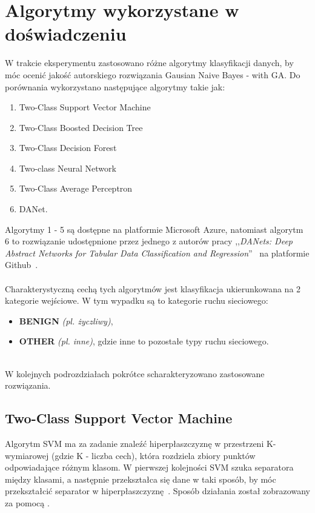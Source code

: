 \section{Algorytmy wykorzystane w doświadczeniu}
\label{sec:alg}
W trakcie eksperymentu zastosowano różne algorytmy klasyfikacji danych, by móc ocenić jakość autorskiego rozwiązania Gausian Naive Bayes - with GA. Do porównania wykorzystano następujące algorytmy takie jak:
\begin{enumerate}
    \item Two-Class Support Vector Machine
    \item Two-Class Boosted Decision Tree
    \item Two-Class Decision Forest
    \item Two-class Neural Network
    \item Two-Class Average Perceptron
    \item DANet.
\end{enumerate}
Algorytmy 1 - 5 są dostępne na platformie Microsoft Azure, natomiast algorytm 6 to rozwiązanie udostępnione przez jednego z autorów pracy ,,\textit{DANets: Deep Abstract Networks for Tabular Data Classification and Regression}''~\cite{Chen2022} na platformie Github~\cite{Danet}.
\\ \\
Charakterystyczną cechą tych algorytmów jest klasyfikacja ukierunkowana na 2 kategorie wejściowe. W tym wypadku są to kategorie ruchu sieciowego:
\begin{itemize}
    \item \textbf{BENIGN} \textit{(pl. życzliwy)},
    \item \textbf{OTHER} \textit{(pl. inne)}, gdzie inne to pozostałe typy ruchu sieciowego.
\end{itemize}
\ \\
W kolejnych podrozdziałach pokrótce scharakteryzowano zastosowane rozwiązania.

\subsection{Two-Class Support Vector Machine}\label{subsec:svm}
Algorytm SVM ma za zadanie znaleźć hiperpłaszczyznę w przestrzeni K-wymiarowej (gdzie K - liczba cech), która rozdziela zbiory punktów odpowiadające różnym klasom. W pierwszej kolejności SVM szuka separatora między klasami, a następnie przekształca się dane w taki sposób, by móc przekształcić separator w hiperpłaszczyznę~\cite{IBM}. Sposób działania został zobrazowany za pomocą .

